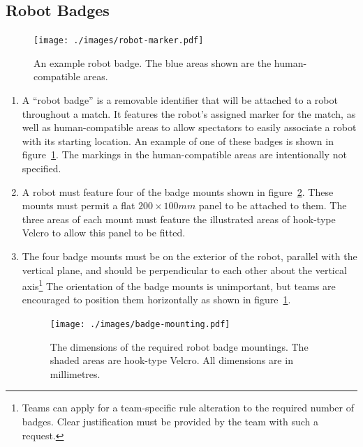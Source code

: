 \subsection{Robot Badges}
\label{sec:robot-badges}

\begin{figure}
  \centering
  \texttt{[image: ./images/robot-marker.pdf]}
  \caption{An example robot badge.
 The blue areas shown are the human-compatible areas.}
  \label{fig:example-badge}
\end{figure}

\begin{enumerate}
\item A ``robot badge'' is a removable identifier that will be attached to a robot throughout a match.
      It features the robot's assigned marker for the match, as well as human-compatible areas to allow spectators to easily associate a robot with its starting location.
      An example of one of these badges is shown in figure~\ref{fig:example-badge}.
      The markings in the human-compatible areas are intentionally not specified.

\item A robot must feature four of the badge mounts shown in figure~\ref{fig:badge-mounting}.
      These mounts must permit a flat $200 \times 100mm$ panel to be attached to them.
      The three areas of each mount must feature the illustrated areas of hook-type Velcro to allow this panel to be fitted.

\item The four badge mounts must be on the exterior of the robot, parallel with the vertical plane, and should be perpendicular to each other about the vertical axis\footnote{Teams can apply for a team-specific rule alteration to the required number of badges.
      Clear justification must be provided by the team with such a request.}
      The orientation of the badge mounts is unimportant, but teams are encouraged to position them horizontally as shown in figure~\ref{fig:example-badge}.

  \begin{figure}
    \centering
    \texttt{[image: ./images/badge-mounting.pdf]}
    \caption{The dimensions of the required robot badge mountings.
 The shaded areas are hook-type Velcro.
 All dimensions are in millimetres.}
    \label{fig:badge-mounting}
  \end{figure}
\end{enumerate}

